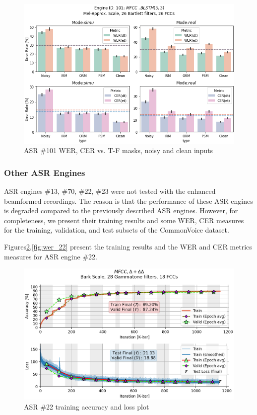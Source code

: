 \begin{figure}[H]
    \centering
    \includegraphics[width=0.95\linewidth]{ASR/images/asr101_wer_masks.png}
    \caption{ASR \#101 WER, CER vs. T-F masks, noisy and clean inputs }\label{fig:asr101_wer_masks}
\end{figure}


\subsubsection{Other ASR Engines}
ASR engines \#13, \#70, \#22, \#23
were not tested with the enhanced beamformed recordings.
The reason is that the performance of these ASR engines
is degraded compared to the previously described ASR engines.
However, for completeness, we present their training results
and some WER, CER measures for the training, validation,
and test subsets of the CommonVoice dataset.

\bigskip

Figures\;\ref{fig:asr_22},\;\ref{fig:wer_22}
present the training results and the WER and CER
metrics measures for ASR engine \#22.

\begin{figure}[H]
    \centering
    \includegraphics[width=0.95\linewidth]{Experiments/images/asr_22}
    \caption{ASR \#22 training accuracy and loss plot}\label{fig:asr_22}
\end{figure}

